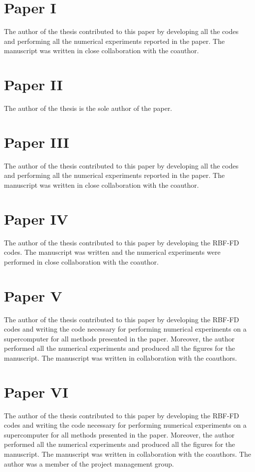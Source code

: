 \documentclass{UUThesisTemplate}
\begin{document}
%
\section*{Paper I}
The author of the thesis contributed to this paper by developing all the codes and performing all the numerical experiments reported in the paper. The manuscript was written in close collaboration with the coauthor. 




%
\section*{Paper II}
The author of the thesis is the sole author of the paper.



%
\section*{Paper III}
The author of the thesis contributed to this paper by developing all the codes and performing all the numerical experiments reported in the paper. The manuscript was written in close collaboration with the coauthor. 




%
\section*{Paper IV}
The author of the thesis contributed to this paper by developing the RBF-FD codes. The manuscript was written and the numerical experiments were performed in close collaboration with the coauthor. 



%
\newpage
\section*{Paper V}
The author of the thesis contributed to this paper by developing the RBF-FD codes and writing the code necessary for performing numerical experiments on a supercomputer for all methods presented in the paper. Moreover, the author performed all the numerical experiments and produced all the figures for the manuscript. The manuscript was written in collaboration with the coauthors. 





%
\section*{Paper VI}
The author of the thesis contributed to this paper by developing the RBF-FD codes and writing the code necessary for performing numerical experiments on a supercomputer for all methods presented in the paper. Moreover, the author performed all the numerical experiments and produced all the figures for the manuscript. The manuscript was written in collaboration with the coauthors. The author was a member of the project management group.
\end{document}
